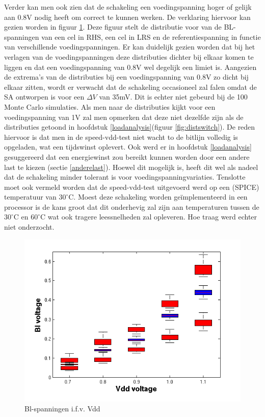 Verder kan men ook zien dat de schakeling een voedingspanning hoger of gelijk aan 0.8V nodig heeft om correct te kunnen werken. De verklaring hiervoor kan gezien worden in figuur \ref{fig:vblvdd}. Deze figuur stelt de distributie voor van de BL-spanningen van een cel in RHS, een cel in LRS en de referentiespanning in functie van verschillende voedingspanningen. Er kan duidelijk gezien worden dat bij het verlagen van de voedingspanningen deze distributies dichter bij elkaar komen te liggen en dat een voedingspanning van 0.8V wel degelijk een limiet is. Aangezien de extrema's van de distributies bij een voedingspanning van 0.8V zo dicht bij elkaar zitten, wordt er verwacht dat de schakeling occasioneel zal falen omdat de SA ontworpen is voor een $\Delta V$ van 35mV. Dit is echter niet gebeurd bij de 100 Monte Carlo simulaties.
Als men naar de distributies kijkt voor een voedingspanning van 1V zal men opmerken dat deze niet dezelfde zijn als de distributies getoond in hoofdstuk \ref{loadanalysis}(figuur \ref{fig:distswitch}). De reden hiervoor is dat men in de speed-vdd-test niet wacht to de bitlijn volledig is opgeladen, wat een tijdswinst oplevert. Ook werd er in hoofdstuk \ref{loadanalysis} gesuggereerd dat een energiewinst zou bereikt kunnen worden door een andere last te kiezen (sectie \ref{anderelast}). Hoewel dit mogelijk is, heeft dit wel als nadeel dat de schakeling minder tolerant is voor voedingspanningvariaties. Tenslotte moet ook vermeld worden dat de speed-vdd-test uitgevoerd werd op een (SPICE) temperatuur van $30^{\circ}\mathrm{C}$. Moest deze schakeling worden geïmplementeerd in een processor is de kans groot dat dit onderhevig zal zijn aan temperaturen tussen de $30^{\circ}\mathrm{C}$ en $60^{\circ}\mathrm{C}$ wat ook tragere leessnelheden zal opleveren. Hoe traag werd echter niet onderzocht.

\begin{figure}[!ht]
  \centering
  \includegraphics[scale=0.8]{../fig/hfdst-final-vddbl.png}
  \caption[Bl-spanningen i.f.v. Vdd]{Bl-spanningen i.f.v. Vdd}
  \label{fig:vblvdd}
\end{figure}


